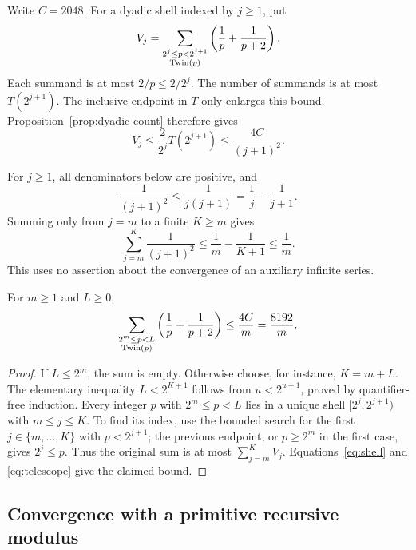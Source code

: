Write \(C=2048\). For a dyadic shell indexed by \(j\ge1\), put
\[
 V_j=\sum_{\substack{2^j\le p<2^{j+1}\\\operatorname{Twin}(p)}}
              \left(\frac1p+\frac1{p+2}\right).
\]
Each summand is at most \(2/p\le2/2^j\).
The number of summands is at most \(T(2^{j+1})\). The inclusive endpoint
in \(T\) only enlarges this bound. Proposition~\ref{prop:dyadic-count}
therefore gives
\begin{equation}
 V_j\le\frac2{2^j}T(2^{j+1})
       \le\frac{4C}{(j+1)^2}.
 \label{eq:shell}
\end{equation}

For \(j\ge1\), all denominators below are positive, and
\begin{equation}
 \frac1{(j+1)^2}\le\frac1{j(j+1)}
  =\frac1j-\frac1{j+1}.
 \label{eq:telescope-step}
\end{equation}
Summing only from \(j=m\) to a finite \(K\ge m\) gives
\begin{equation}
 \sum_{j=m}^{K}\frac1{(j+1)^2}
 \le\frac1m-\frac1{K+1}\le\frac1m.
 \label{eq:telescope}
\end{equation}
This uses no assertion about the convergence of an auxiliary infinite
series.

\begin{proposition}
\label{prop:tail}
For \(m\ge1\) and \(L\ge0\),
\[
 \sum_{\substack{2^m\le p<L\\\operatorname{Twin}(p)}}
          \left(\frac1p+\frac1{p+2}\right)
 \le\frac{4C}{m}=\frac{8192}{m}.
\]
\end{proposition}

\begin{proof}
If \(L\le2^m\), the sum is empty. Otherwise choose, for instance,
\(K=m+L\). The elementary inequality \(L<2^{K+1}\) follows from
\(u<2^{u+1}\), proved by quantifier-free induction.
Every integer \(p\) with \(2^m\le p<L\) lies in a unique shell
\([2^j,2^{j+1})\) with \(m\le j\le K\).
To find its index, use the bounded search for the first
\(j\in\{m,\ldots,K\}\) with \(p<2^{j+1}\); the previous endpoint,
or \(p\ge2^m\) in the first case, gives \(2^j\le p\).
Thus the original sum is at most \(\sum_{j=m}^K V_j\).
Equations~\eqref{eq:shell} and \eqref{eq:telescope} give the claimed bound.
\end{proof}

\subsection{Convergence with a primitive recursive modulus}

